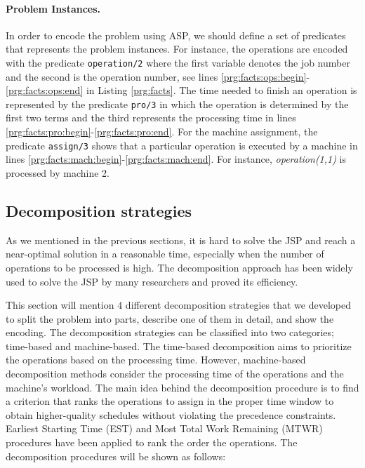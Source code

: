 \documentclass{tlp} %
\begin{document}
\paragraph{Problem Instances.} 

In order to encode the problem using ASP, we should define a set of predicates that represents the problem instances. For instance, the operations are encoded with the predicate \lstinline{operation/2} where the first variable denotes the job number and the second is the operation number, see lines \ref{prg:facts:ops:begin}-\ref{prg:facts:ops:end} in Listing \ref{prg:facts}. The time needed to finish an operation is represented by the predicate \lstinline{pro/3} in which the operation is determined by the first two terms and the third represents the processing time in lines \ref{prg:facts:pro:begin}-\ref{prg:facts:pro:end}. For the machine assignment, the predicate \lstinline{assign/3} shows that a particular operation is executed by a machine in lines \ref{prg:facts:mach:begin}-\ref{prg:facts:mach:end}. For instance, \emph{operation(1,1)} is processed by machine 2. 


\subsection{Decomposition strategies}
As we mentioned in the previous sections, it is hard to solve the JSP and reach a near-optimal solution in a reasonable time, especially when the number of operations to be processed is high. The decomposition approach has been widely used to solve the JSP by many researchers and proved its efficiency.

This section will mention $4$ different decomposition strategies that we developed to split the problem into parts, describe one of them in detail, and show the encoding. The decomposition strategies can be classified into two categories; time-based and machine-based. The time-based decomposition aims to prioritize the operations based on the processing time. However, machine-based decomposition methods consider the processing time of the operations and the machine's workload. The main idea behind the decomposition procedure is to find a criterion that ranks the operations to assign in the proper time window to obtain higher-quality schedules without violating the precedence constraints. Earliest Starting Time (EST) and Most Total Work Remaining (MTWR) procedures have been applied to rank the order the operations. The decomposition procedures will be shown as follows:
\end{document}
